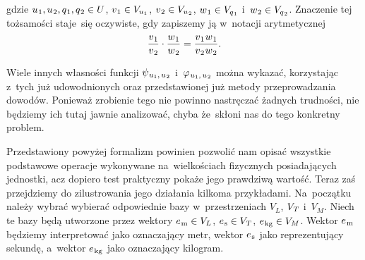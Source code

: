\documentclass[a4paper,11pt]{article}
\numberwithin{equation}{section}
\begin{document}
gdzie $u_{ \HorSpaceOne 1 }, u_{ \HorSpaceOne 2 }, q_{ \HorSpaceOne 1 },
q_{ \HorSpaceOne 2 } \in U$, $v_{ \HorSpaceOne 1 } \in V_{ u_{ 1 } }$,
$v_{ \HorSpaceOne 2 } \in V_{ u_{ \HorSpaceOne 2 } }$,
$w_{ \HorSpaceOne 1 } \in V_{ q_{ \HorSpaceOne 1 } }$
i~$w_{ \HorSpaceOne 2 } \in V_{ q_{ \HorSpaceTwo 2 } }$. Znaczenie tej tożsamości
staje~się oczywiste, gdy zapiszemy ją w~notacji arytmetycznej
\begin{equation}
  \label{eq:Mechanika-Rozwazania-ogolne-31}
  \frac{ v_{ \HorSpaceOne 1 } }{ v_{ \HorSpaceOne 2 } } \cdot
  \frac{ w_{ \HorSpaceOne 1 } }{ w_{ \HorSpaceOne 2 } } =
  \frac{ v_{ \HorSpaceOne 1 } \HorSpaceOne w_{ \HorSpaceOne 1 } }{
    v_{ \HorSpaceOne 2 } \HorSpaceOne w_{ \HorSpaceOne 2 } }.
\end{equation}

Wiele innych własności funkcji
$\psi_{ \HorSpaceOne u_{ 1 }, \, u_{ \HorSpaceOne 2 } }$
i~$\varphi_{ \HorSpaceTwo u_{ 1 }, \, u_{ \HorSpaceOne 2 } }$ można wykazać,
korzystając z~tych już udowodnionych oraz przedstawionej już metody
przeprowadzania dowodów. Ponieważ zrobienie tego nie powinno nastręczać
żadnych trudności, nie będziemy ich tutaj jawnie analizować, chyba
że~skłoni nas do tego konkretny problem.

Przedstawiony powyżej formalizm powinien pozwolić nam opisać wszystkie
podstawowe operacje wykonywane na~wielkościach fizycznych posiadających
jednostki, acz dopiero test praktyczny pokaże jego prawdziwą wartość. Teraz
zaś przejdziemy do zilustrowania jego działania kilkoma przykładami.
Na~początku należy wybrać wybierać odpowiednie bazy w~przestrzeniach
$V_{ L }$, $V_{ \HorSpaceOne T }$ i~$V_{ M }$. Niech te bazy będą utworzone
przez wektory $e_{ \HorSpaceOne \si{m} } \in V_{ L }$,
$e_{ \HorSpaceOne \si{s} } \in V_{ \HorSpaceOne T }$,
$e_{ \HorSpaceOne \si{kg} } \in V_{ M }$. Wektor $e_{ \HorSpaceOne \si{m} }$ będziemy
interpretować jako oznaczający metr, wektor $e_{ \HorSpaceOne \si{s} }$ jako
reprezentujący sekundę, a~wektor $e_{ \HorSpaceOne \si{kg} }$ jako oznaczający
kilogram.
\end{document}
